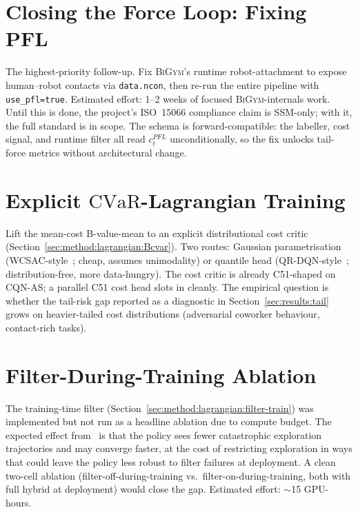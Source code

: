 \documentclass[11pt,a4paper]{report}
\newcommand{\ssm}{SSM}
\newcommand{\pfl}{PFL}
\newcommand{\iso}{ISO~15066}
\newcommand{\cvar}{\ensuremath{\mathrm{CVaR}}}
\newcommand{\bigym}{\textsc{BiGym}}
\newcommand{\cqnas}{CQN-AS}
\begin{document}
\section{Closing the Force Loop: Fixing \pfl{}}
\label{sec:fw:pfl}

The highest-priority follow-up. Fix \bigym{}'s runtime
robot-attachment to expose human--robot contacts via
\texttt{data.ncon}, then re-run the entire pipeline with
\texttt{use\_pfl=true}. Estimated effort: 1--2 weeks of focused
\bigym{}-internals work. Until this is done, the project's
\iso{} compliance claim is \ssm{}-only; with it, the full standard
is in scope. The schema is forward-compatible: the labeller, cost
signal, and runtime filter all read $c^{\pfl}_t$ unconditionally,
so the fix unlocks tail-force metrics without architectural change.

\section{Explicit \cvar{}-Lagrangian Training}
\label{sec:fw:cvar}

Lift the mean-cost B-value-mean to an explicit distributional cost
critic (Section~\ref{sec:method:lagrangian:Bcvar}). Two routes:
Gaussian parametrisation (WCSAC-style~\cite{yang2021wcsac}; cheap,
assumes unimodality) or quantile head (QR-DQN-style~\cite{dabney2018qrdqn};
distribution-free, more data-hungry). The cost critic is already
C51-shaped on \cqnas{}; a parallel C51 cost head slots in cleanly.
The empirical question is whether the tail-risk gap reported as a
diagnostic in Section~\ref{sec:results:tail} grows on
heavier-tailed cost distributions (adversarial coworker behaviour,
contact-rich tasks).

\section{Filter-During-Training Ablation}
\label{sec:fw:filter-during-training}

The training-time filter (Section~\ref{sec:method:lagrangian:filter-train})
was implemented but not run as a headline ablation due to compute
budget. The expected effect from~\cite{cbfrl2024,shield2025} is
that the policy sees fewer catastrophic exploration trajectories
and may converge faster, at the cost of restricting exploration in
ways that could leave the policy less robust to filter failures at
deployment. A clean two-cell ablation (filter-off-during-training
vs.\ filter-on-during-training, both with full hybrid at deployment)
would close the gap. Estimated effort: $\sim$15 GPU-hours.
\end{document}

